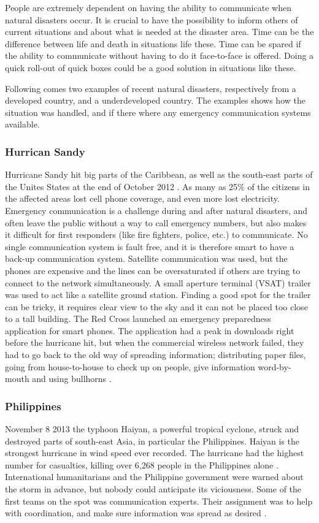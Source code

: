 People are extremely dependent on having the ability to communicate when natural disasters occur. It is crucial to have the possibility to inform others of current situations and about what is needed at the disaster area. Time can be the difference between life and death in situations life these. Time can be spared if the ability to communicate without having to do it face-to-face is offered. Doing a quick roll-out of \gls{quick} boxes could be a good solution in situations like these. 

Following comes two examples of recent natural disasters, respectively from a developed country, and a underdeveloped country. The examples shows how the situation was handled, and if there where any emergency communication systems available. 

\subsubsection{Hurrican Sandy}
Hurricane Sandy hit big parts of the Caribbean, as well as the south-east parts of the Unites States at the end of October 2012 \cite{WikiSandy}. As many as 25\% of the citizens in the affected areas lost cell phone coverage, and even more lost electricity. Emergency communication is a challenge during and after natural disasters, and often leave the public without a way to call emergency numbers, but also makes it difficult for first responders (like fire fighters, police, etc.) to communicate. No single communication system is fault free, and it is therefore smart to have a back-up communication system. Satellite communication was used, but the phones are expensive and the lines can be oversaturated if others are trying to connect to the network simultaneously. A small aperture terminal (VSAT) trailer was used to act like a satellite ground station. Finding a good spot for the trailer can be tricky, it requires clear view to the sky and it can not be placed too close to a tall building. The Red Cross launched an emergency preparedness application for smart phones. The application had a peak in downloads right before the hurricane hit, but when the commercial wireless network failed, they had to go back to the old way of spreading information; distributing paper files, going from house-to-house to check up on people, give information word-by-mouth and using bullhorns \cite{hurricaneSandy}.

\subsubsection{Philippines}
November 8 2013 the typhoon Haiyan, a powerful tropical cyclone, struck and destroyed parts of south-east Asia, in particular the Philippines. Haiyan is the strongest hurricane in wind speed ever recorded. The hurricane had the highest number for casualties, killing over 6,268 people in the Philippines alone \cite{wikiHaiyan}. International humanitarians and the Philippine government were warned about the storm in advance, but nobody could anticipate its viciousness. Some of the first teams on the spot was communication experts. Their assignment was to help with coordination, and make sure information was spread as desired \cite{disasterResponse}.

